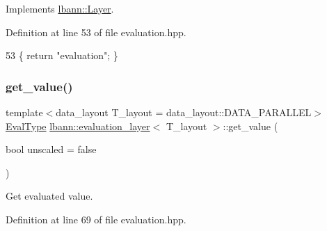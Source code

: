 Implements \hyperlink{classlbann_1_1Layer_a0fa0ea9160b490c151c0a17fde4f7239}{lbann\+::\+Layer}.



Definition at line 53 of file evaluation.\+hpp.


\begin{DoxyCode}
53 \{ \textcolor{keywordflow}{return} \textcolor{stringliteral}{"evaluation"}; \}
\end{DoxyCode}
\mbox{\label{classlbann_1_1evaluation__layer_a5300d3b7dd4719d2535f9b4838ae996f}} 
\subsubsection{\texorpdfstring{get\+\_\+value()}{get\_value()}}
{\footnotesize\ttfamily template$<$data\+\_\+layout T\+\_\+layout = data\+\_\+layout\+::\+D\+A\+T\+A\+\_\+\+P\+A\+R\+A\+L\+L\+EL$>$ \\
\hyperlink{base_8hpp_a3266f5ac18504bbadea983c109566867}{Eval\+Type} \hyperlink{classlbann_1_1evaluation__layer}{lbann\+::evaluation\+\_\+layer}$<$ T\+\_\+layout $>$\+::get\+\_\+value (\begin{DoxyParamCaption}\item[{bool}]{unscaled = {\ttfamily false} }\end{DoxyParamCaption})\hspace{0.3cm}{\ttfamily [inline]}}

Get evaluated value. 

Definition at line 69 of file evaluation.\+hpp.


